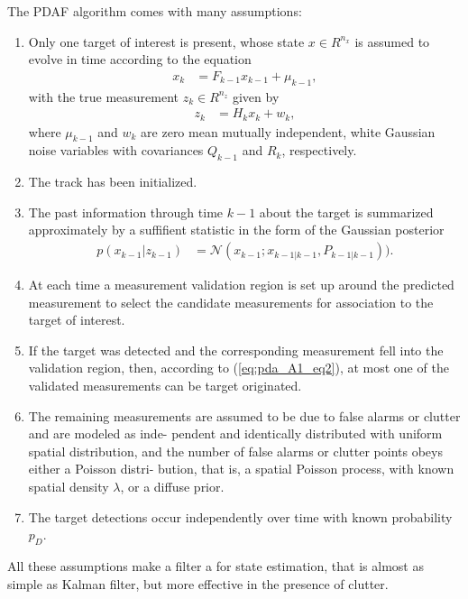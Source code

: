 The PDAF algorithm comes with many assumptions:
\begin{enumerate}
    \item Only one target of interest is present, whose state $x \in R^{n_x}$ is assumed to evolve in time according to the equation
        \begin{align}
            x_k &= F_{k-1} x_{k-1} + \mu_{k-1},
        \end{align}
        with the true measurement $z_k \in R^{n_z}$ given by
        \begin{align}
            \label{eq:pda_A1_eq2}
            z_k &= H_k x_k + w_k,
        \end{align}
        where $\mu_{k-1}$ and $w_k$ are zero mean mutually independent, white Gaussian noise variables with covariances $Q_{k-1}$ and $R_k$, respectively.
    \item The track has been initialized.
    \item The past information through time $k-1$ about the target is summarized approximately by a suffifient statistic in the form of the Gaussian posterior
        \begin{align}
            p(x_{k-1}|z_{k-1}) &= \mathcal{N}(x_{k-1}; x_{k-1|k-1}, P_{k-1|k-1})). \label{eq:pda_A3}
        \end{align}
    \item At each time a measurement validation region is set up around the predicted measurement to select the candidate measurements for association to the target of interest.
    \item If the target was detected and the corresponding
    measurement fell into the validation region, then,
    according to (\ref{eq:pda_A1_eq2}), at most one of the validated measurements can be target originated.
    \item The remaining measurements are assumed to be due
    to false alarms or clutter and are modeled as inde-
    pendent and identically distributed with uniform spatial distribution, and the number of false alarms or clutter points obeys either a Poisson distri-
    bution, that is, a spatial Poisson process, with known
    spatial density $\lambda$, or a diffuse prior.
    \item The target detections occur independently over time
    with known probability $p_D$.
\end{enumerate}
All these assumptions make a filter a for state estimation, that is almost as simple as Kalman filter, but more effective in the presence of clutter.

